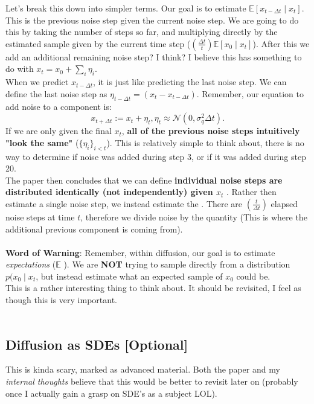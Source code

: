\documentclass[10pt, oneside]{report}
\newcommand{\E}{\mathbb{E}}
\begin{document}
Let's break this down into simpler terms.  Our goal is to estimate $\E[x_{t-\Delta t} \mid x_t]$.  This is the previous noise step given the current noise step. We are going to do this by taking the number of steps so far, and multiplying directly by the estimated sample given by the current time step ($(\frac{\Delta t}{t}) \E[x_0 \mid x_t]$).  After this we add an additional remaining noise step? I think? I believe this has something to do with $x_t = x_0 + \sum_i \eta_i$.\\
When we predict $x_{t - \Delta t}$, it is just like predicting the last noise step.  We can define the last noise step as $\eta_{t - \Delta t} = (x_t - x_{t - \Delta t})$.  Remember, our equation to add noise to a component is:
\[
    x_{t + \Delta t} := x_t + \eta_t, \eta_t \approx \mathcal{N}(0, \sigma^2_q \Delta t)
.\] 
If we are only given the final $x_t$, \textbf{all of the previous noise steps intuitively "look the same"} ($\{\eta_i\}_{i<t}$). This is relatively simple to think about, there is no way to determine if noise was added during step 3, or if it was added during step 20.  \\
The paper then concludes that we can define \textbf{individual noise steps are distributed identically (not independently) given $x_t$ }.  Rather then estimate a single noise step, we instead estimate the  .  There are $(\frac{t}{\Delta t})$ elapsed noise steps at time $t$, therefore we divide noise by the quantity (This is where the additional previous component is coming from).  \\
\\
\textbf{Word of Warning}: Remember, within diffusion, our goal is to estimate \textit{expectations} ($\E$ ).  We are \textbf{NOT} trying to sample directly from a distribution $p(x_0 \mid x_t$, but instead estimate what an expected sample of $x_0$ could be.\\
This is a rather interesting thing to think about.  It should be revisited, I feel as though this is very important.\\
\\
\subsection{Diffusion as SDEs [Optional]}
This is kinda scary, marked as advanced material.  Both the paper and my \textit{internal thoughts} believe that this would be better to revisit later on (probably once I actually gain a grasp on SDE's as a subject LOL).\\
\end{document}
